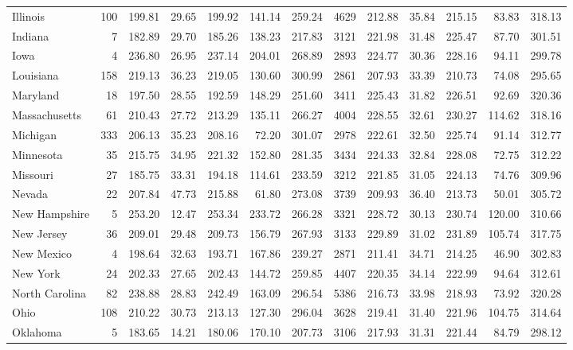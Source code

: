 \begin{sidewaystable}[htb]
\begin{center}
{\begin{tabular}{lrrrrrr@{\extracolsep{10pt}}rrrrrr}
  Illinois & 100 & 199.81 & 29.65 & 199.92 & 141.14 & 259.24 & 4629 & 212.88 & 35.84 & 215.15 & 83.83 & 318.13 \\ 
  Indiana &   7 & 182.89 & 29.70 & 185.26 & 138.23 & 217.83 & 3121 & 221.98 & 31.48 & 225.47 & 87.70 & 301.51 \\ 
  Iowa &   4 & 236.80 & 26.95 & 237.14 & 204.01 & 268.89 & 2893 & 224.77 & 30.36 & 228.16 & 94.11 & 299.78 \\ 
  Louisiana & 158 & 219.13 & 36.23 & 219.05 & 130.60 & 300.99 & 2861 & 207.93 & 33.39 & 210.73 & 74.08 & 295.65 \\ 
  Maryland &  18 & 197.50 & 28.55 & 192.59 & 148.29 & 251.60 & 3411 & 225.43 & 31.82 & 226.51 & 92.69 & 320.36 \\ 
  Massachusetts &  61 & 210.43 & 27.72 & 213.29 & 135.11 & 266.27 & 4004 & 228.55 & 32.61 & 230.27 & 114.62 & 318.16 \\ 
  Michigan & 333 & 206.13 & 35.23 & 208.16 & 72.20 & 301.07 & 2978 & 222.61 & 32.50 & 225.74 & 91.14 & 312.77 \\ 
  Minnesota &  35 & 215.75 & 34.95 & 221.32 & 152.80 & 281.35 & 3434 & 224.33 & 32.84 & 228.08 & 72.75 & 312.22 \\ 
  Missouri &  27 & 185.75 & 33.31 & 194.18 & 114.61 & 233.59 & 3212 & 221.85 & 31.05 & 224.13 & 74.76 & 309.96 \\ 
  Nevada &  22 & 207.84 & 47.73 & 215.88 & 61.80 & 273.08 & 3739 & 209.93 & 36.40 & 213.73 & 50.01 & 305.72 \\ 
  New Hampshire &   5 & 253.20 & 12.47 & 253.34 & 233.72 & 266.28 & 3321 & 228.72 & 30.13 & 230.74 & 120.00 & 310.66 \\ 
  New Jersey &  36 & 209.01 & 29.48 & 209.73 & 156.79 & 267.93 & 3133 & 229.89 & 31.02 & 231.89 & 105.74 & 317.75 \\ 
  New Mexico &   4 & 198.64 & 32.63 & 193.71 & 167.86 & 239.27 & 2871 & 211.41 & 34.71 & 214.25 & 46.90 & 302.83 \\ 
  New York &  24 & 202.33 & 27.65 & 202.43 & 144.72 & 259.85 & 4407 & 220.35 & 34.14 & 222.99 & 94.64 & 312.61 \\ 
  North Carolina &  82 & 238.88 & 28.83 & 242.49 & 163.09 & 296.54 & 5386 & 216.73 & 33.98 & 218.93 & 73.92 & 320.28 \\ 
  Ohio & 108 & 210.22 & 30.73 & 213.13 & 127.30 & 296.04 & 3628 & 219.41 & 31.40 & 221.96 & 104.75 & 314.64 \\ 
  Oklahoma &   5 & 183.65 & 14.21 & 180.06 & 170.10 & 207.73 & 3106 & 217.93 & 31.31 & 221.44 & 84.79 & 298.12 \\ 

\end{tabular}}
\end{center}
\end{sidewaystable}
